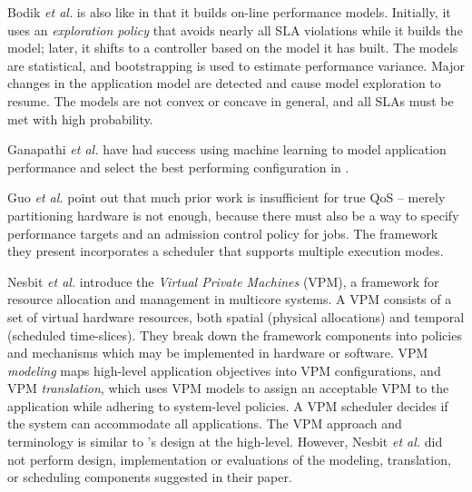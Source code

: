 Bodik \emph{et al.}\cite{bodik-acdc09} is also like \pacora in that it builds on-line performance models.
Initially, it uses an \emph{exploration policy} that avoids nearly all SLA violations while it builds the model;
later, it shifts to a controller based on the model it has built.
The models are statistical, and bootstrapping is used to estimate performance variance.
Major changes in the application model are detected and cause model exploration to resume.
The models are not convex or concave in general, and all SLAs must be met with high probability.

Ganapathi \emph{et al.} have had success using machine learning to model application performance and select the best performing configuration in \cite{Archana}.

Guo \emph{et al.}\cite{1331730} point out that much prior work is insufficient for true QoS -- merely partitioning hardware is not enough, because there must also be a way to specify performance targets and an admission control policy for jobs.
The framework they present incorporates a scheduler that supports multiple execution modes.



Nesbit \emph{et al.}\cite{1436097} introduce the \emph{Virtual Private Machines} (VPM), a framework for resource allocation and management in multicore systems. A VPM consists of a set of virtual hardware resources, both spatial (physical allocations) and temporal (scheduled time-slices).  They break down the framework components into policies and mechanisms which may be implemented in hardware or software. VPM {\em modeling} maps high-level application objectives into VPM configurations, and VPM {\em translation}, which uses VPM models to assign an acceptable VPM to the application while adhering to system-level policies. A VPM scheduler decides if the system can accommodate all applications. The VPM approach and terminology is similar to \pacora's design at the high-level.  However, Nesbit \emph{et al.} did not perform design, implementation or evaluations of the modeling, translation, or scheduling components suggested in their paper.

%

